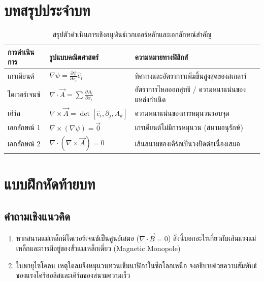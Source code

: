 \section{บทสรุปประจำบท}
\begin{table}[H]
    \centering
    \caption{สรุปตัวดำเนินการเชิงอนุพันธ์เวกเตอร์หลักและเอกลักษณ์สำคัญ}
    \label{tab:vector_ops_summary}
    \begin{tabularx}{\textwidth}{p{2.6cm}p{5.5cm}Y}
        \toprule
        \textbf{การดำเนินการ} & \textbf{รูปแบบคณิตศาสตร์} & \textbf{ความหมายทางฟิสิกส์} \\
        \midrule
        เกรเดียนต์ & $\nabla \psi = \frac{\partial \psi}{\partial x_i}\hat{e}_i$ & ทิศทางและอัตราการเพิ่มขึ้นสูงสุดของสเกลาร์ \\
        ไดเวอร์เจนซ์ & $\nabla \cdot \vec{A} = \sum \frac{\partial A_i}{\partial x_i}$ & อัตราการไหลออกสุทธิ / ความหนาแน่นของแหล่งกำเนิด \\
        เคิร์ล & $\nabla \times \vec{A} = \det[\hat{e}_i, \partial_j, A_k]$ & ความหนาแน่นของการหมุนวนรอบจุด \\
        เอกลักษณ์ 1 & $\nabla \times (\nabla \psi) = \vec{0}$ & เกรเดียนต์ไม่มีการหมุนวน (สนามอนุรักษ์) \\
        เอกลักษณ์ 2 & $\nabla \cdot (\nabla \times \vec{A}) = 0$ & เส้นสนามของเคิร์ลเป็นวงปิดต่อเนื่องเสมอ \\
        \bottomrule
    \end{tabularx}
\end{table}

\section{แบบฝึกหัดท้ายบท}
\subsection{คำถามเชิงแนวคิด}
\begin{enumerate}
    \item หากสนามแม่เหล็กมีไดเวอร์เจนซ์เป็นศูนย์เสมอ ($\nabla \cdot \vec{B} = 0$) สิ่งนี้บอกอะไรเกี่ยวกับเส้นแรงแม่เหล็กและการมีอยู่ของขั้วแม่เหล็กเดี่ยว (Magnetic Monopole)
    \item ในพายุไซโคลน เหตุใดลมจึงหมุนวนทวนเข็มนาฬิกาในซีกโลกเหนือ จงอธิบายด้วยความสัมพันธ์ของแรงโคริออลิสและเคิร์ลของสนามความเร็ว
\end{enumerate}

